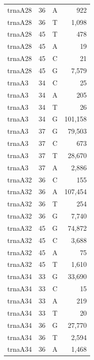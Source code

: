 \documentclass[12pt]{rockefeller}
\begin{document}
{\begin{center}
\begin{supertabular}{|l|r|c|r|}
 trnaA28 &        36 &          A &        922 \\
 trnaA28 &        36 &          T &      1,098 \\
 trnaA28 &        45 &          T &        478 \\
 trnaA28 &        45 &          A &         19 \\
 trnaA28 &        45 &          C &         21 \\
 trnaA28 &        45 &          G &      7,579 \\
  trnaA3 &        34 &          C &         25 \\
  trnaA3 &        34 &          A &        205 \\
  trnaA3 &        34 &          T &         26 \\
  trnaA3 &        34 &          G &    101,158 \\
  trnaA3 &        37 &          G &     79,503 \\
  trnaA3 &        37 &          C &        673 \\
  trnaA3 &        37 &          T &     28,670 \\
  trnaA3 &        37 &          A &      2,886 \\
 trnaA32 &        36 &          C &        155 \\
 trnaA32 &        36 &          A &    107,454 \\
 trnaA32 &        36 &          T &        254 \\
 trnaA32 &        36 &          G &      7,740 \\
 trnaA32 &        45 &          G &     74,872 \\
 trnaA32 &        45 &          C &      3,688 \\
 trnaA32 &        45 &          A &         75 \\
 trnaA32 &        45 &          T &      1,610 \\
 trnaA34 &        33 &          G &     33,690 \\
 trnaA34 &        33 &          C &         15 \\
 trnaA34 &        33 &          A &        219 \\
 trnaA34 &        33 &          T &         20 \\
 trnaA34 &        36 &          G &     27,770 \\
 trnaA34 &        36 &          T &      2,594 \\
 trnaA34 &        36 &          A &      1,468 \\

\end{supertabular}
\end{center}}
\end{document}
